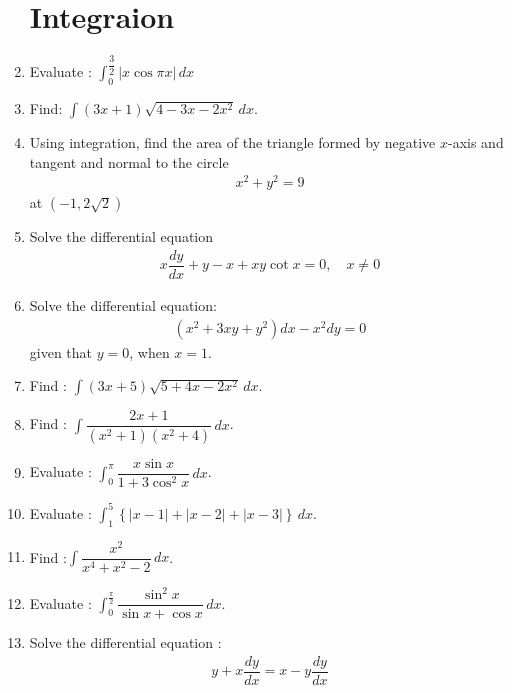 \documentclass[12pt,-letter paper]{article}
\theoremstyle{remark}
\providecommand{\brak}[1]{\ensuremath{\left(#1\right)}}
\providecommand{\cbrak}[1]{\ensuremath{\left\{#1\right\}}}
\providecommand{\abs}[1]{\left\vert#1\right\vert}
\begin{document}
\begin{enumerate}
            \section{Integraion}
      \item Evaluate : $\int_{0}^{\dfrac{3}{2}} \abs{x \cos \pi x}\,dx$
      \item Find: $\int \brak{3x +1}\sqrt{4-3x-2x^2} \,dx$.
      \item Using integration, find the area of the triangle formed by negative $x$-axis and tangent and normal to the circle
            \begin{align*}
                  x^2 + y^2 =9
            \end{align*}
            at \brak{-1,2\sqrt{2}}
      \item Solve the differential equation
            \begin{align*}
                  x\dfrac{dy}{dx} +y -x +xy \cot x= 0, \quad x\neq 0
            \end{align*}
      \item Solve the differential equation:
            \begin{align*}
                  \brak{x^2+3xy+y^2}dx -x^2dy = 0
            \end{align*}
            given that $y=0$, when $x=1$.
      \item Find : $\int \brak{3x+5}\sqrt{5+4x-2x^2}\,dx$.
      \item Find : $\int \dfrac{2x+1}{\brak{x^2+1}\brak{x^2+4}}\,dx$.
      \item Evaluate : $\int_{0}^{\pi}\dfrac{x\sin x}{1+3\cos^2 x}\,dx$.
      \item Evaluate : $\int_{1}^{5}\cbrak{\abs{x-1}+\abs{x-2}+\abs{x-3}}\,dx$.
      \item Find :$\int \dfrac{x^2}{x^4 + x^2 -2}\,dx$.
      \item Evaluate : $\int_{0}^{\frac{\pi}{2}} \dfrac{\sin^2 x}{\sin x + \cos x} \,dx$.
      \item Solve the differential equation :
            \begin{align*}
                  y+ x\dfrac{dy}{dx} = x-y\dfrac{dy}{dx}
            \end{align*}

\end{enumerate}
\end{document}
